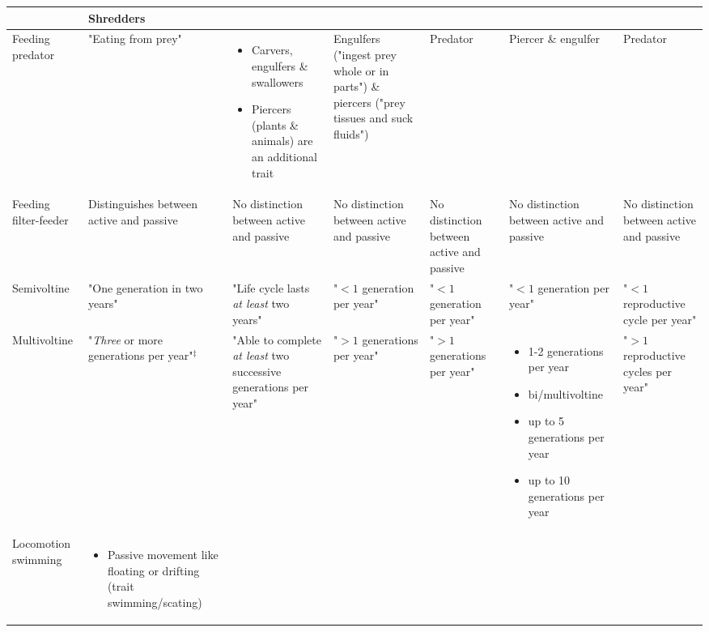 \documentclass[../Draft_harmonization_paper.tex]{subfiles}
\begin{document}
\begin{landscape}
\begin{longtable}{m{1.8cm}|m{3cm}|m{3cm}|m{3cm}|m{3cm}|m{3.2cm}|m{3cm}}
\begin{itemize}
        \end{itemize} & 
        Shredders
        \\ 
        \midrule
        Feeding predator & 
        "Eating from prey" & 
        \begin{itemize}
            \item Carvers, engulfers \& swallowers
            \item Piercers (plants \& animals) are an additional trait
        \end{itemize} & %
        Engulfers ("ingest prey whole or in parts") \& 
        piercers ("prey tissues and suck fluids") & 
        Predator &
        Piercer \& engulfer &
        Predator
        \\ 
        \midrule
        Feeding filter-feeder & 
        Distinguishes between active and passive &
        No distinction between active and passive &
        No distinction between active and passive &
        No distinction between active and passive &
        No distinction between active and passive &
        No distinction between active and passive
        \\
        \toprule[.1em]
        Semivoltine & 
        "One generation in two years" & 
        "Life cycle lasts \textit{at least} two years" & 
        "$< 1$ generation per year" & 
        "$< 1$ generation per year" & 
        "$< 1$ generation per year" & 
        "$< 1$ reproductive cycle per year"
        \\
        \midrule
        Multivoltine & 
        "\textit{Three} or more generations per year"$^{\ddagger}$ & 
        "Able to complete \textit{at least} two successive generations per year" &
        "$> 1$ generations per year" &
        "$> 1$ generations per year" & 
        \begin{itemize}
            \item 1-2 generations per year
            \item bi/multivoltine
            \item up to 5 generations per year
            \item up to 10 generations per year
        \end{itemize}
        & 
        "$> 1$ reproductive cycles per year"
        \\
        \toprule[.1em]
        Locomotion swimming & 
        \begin{itemize}
            \item Passive movement like floating or drifting (trait swimming/scating)

\end{itemize}
\end{longtable}
\end{landscape}
\end{document}
